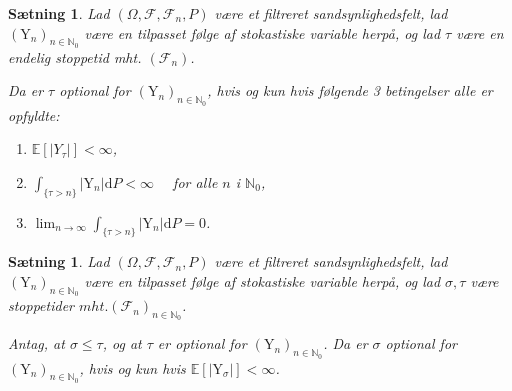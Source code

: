 \documentclass{article}
\newcommand{\1}{\mathbbm{1}}
\theoremstyle{boxed}
\newtheorem{proposition}[theorem]{Sætning}
\begin{document}
\begin{theorem-box}
    \begin{proposition}
        Lad $\left(\Omega, \mathcal{F}, \mathcal{F}_n, P\right)$ være et filtreret sandsynlighedsfelt, lad $\left(\mathrm{Y}_n\right)_{n \in \mathbb{N}_0}$ være en tilpasset følge af stokastiske variable herpå, og lad $\tau$ være en endelig stoppetid mht. $\left(\mathcal{F}_n\right)$.

Da er $\tau$ optional for $\left(\mathrm{Y}_n\right)_{n \in \mathbb{N}_0}$, hvis og kun hvis følgende 3 betingelser alle er opfyldte:
\begin{enumerate}
    \item $\mathbb{E}\left[\left|Y_\tau\right|\right]<\infty$,
    \item $\int_{\{\tau>n\}}\left|\mathrm{Y}_n\right| \mathrm{d} P<\infty \quad$ for alle $n$ i $\mathbb{N}_0$,
    \item $\lim _{n \rightarrow \infty} \int_{\{\tau>n\}}\left|\mathrm{Y}_n\right| \mathrm{d} P=0$.
\end{enumerate}
    \end{proposition}
\end{theorem-box}
\begin{theorem-box}
    \begin{proposition}
        Lad $\left(\Omega, \mathcal{F}, \mathcal{F}_n, P\right)$ være et filtreret sandsynlighedsfelt, lad $\left(\mathrm{Y}_n\right)_{n \in \mathbb{N}_0}$ være en tilpasset følge af stokastiske variable herpå, og lad $\sigma, \tau$ være stoppetider $m h t .\left(\mathcal{F}_n\right)_{n \in \mathbb{N}_0}$.

Antag, at $\sigma \leq \tau$, og at $\tau$ er optional for $\left(\mathrm{Y}_n\right)_{n \in \mathbb{N}_0}$.
Da er $\sigma$ optional for $\left(\mathrm{Y}_n\right)_{n \in \mathbb{N}_0}$, hvis og kun hvis $\mathbb{E}\left[\left|\mathrm{Y}_\sigma\right|\right]<\infty$.
    \end{proposition}
\end{theorem-box}
\end{document}
